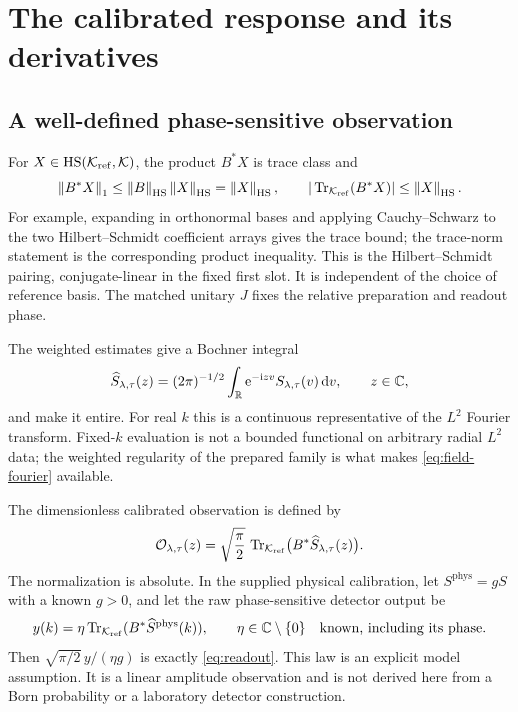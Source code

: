 \section{The calibrated response and its derivatives}
\label{sec:readout}

\subsection{A well-defined phase-sensitive observation}

For $X\in\operatorname{HS}(\mathcal K_{\mathrm{ref}},\mathcal K)$, the product $B^*X$ is trace class and
\begin{equation}
 \left\lVert B^*X\right\rVert_1\le\left\lVert B\right\rVert_{\operatorname{HS}}\left\lVert X\right\rVert_{\operatorname{HS}}=\left\lVert X\right\rVert_{\operatorname{HS}},
 \qquad |\operatorname{Tr}_{\mathcal K_{\mathrm{ref}}}(B^*X)|\le\left\lVert X\right\rVert_{\operatorname{HS}}.
 \label{eq:trace-pairing}
\end{equation}
For example, expanding in orthonormal bases and applying Cauchy--Schwarz
to the two Hilbert--Schmidt coefficient arrays gives the trace bound;
the trace-norm statement is the corresponding product inequality.
This is the Hilbert--Schmidt pairing, conjugate-linear in the fixed
first slot. It is independent of the choice of reference basis. The
matched unitary $J$ fixes the relative preparation and readout phase.

The weighted estimates give a Bochner integral
\begin{equation}
 \widehat S_{\lambda,\tau}(z)
  =(2\pi)^{-1/2}\int_\mathbb R\mathrm e^{-\mathrm i zv}S_{\lambda,\tau}(v)\,\mathrm d v,
 \qquad z\in\mathbb C,
 \label{eq:field-fourier}
\end{equation}
and make it entire. For real $k$ this is a continuous representative
of the $L^2$ Fourier transform. Fixed-$k$ evaluation is not a bounded
functional on arbitrary radial $L^2$ data; the weighted regularity of
the prepared family is what makes \eqref{eq:field-fourier} available.

The dimensionless calibrated observation is defined by
\begin{equation}
 \mathcal O_{\lambda,\tau}(z)
 =\sqrt{\frac\pi2}\,
   \operatorname{Tr}_{\mathcal K_{\mathrm{ref}}}\bigl(B^*\widehat S_{\lambda,\tau}(z)\bigr).
 \label{eq:readout}
\end{equation}
The normalization is absolute. In the supplied physical calibration,
let $S^{\mathrm{phys}}=gS$ with a known $g>0$, and let the raw
phase-sensitive detector output be
\begin{equation}
 y(k)=\eta\operatorname{Tr}_{\mathcal K_{\mathrm{ref}}}(B^*\widehat S^{\mathrm{phys}}(k)),
 \qquad \eta\in\mathbb C\setminus\{0\}
 \quad\hbox{known, including its phase}.
 \label{eq:raw-readout}
\end{equation}
Then $\sqrt{\pi/2}\,y/(\eta g)$ is exactly \eqref{eq:readout}.
This law is an explicit model assumption. It is a linear amplitude
observation and is not derived here from a Born probability or a
laboratory detector construction.

